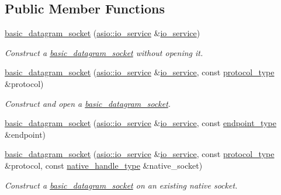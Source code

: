 \subsection*{Public Member Functions}
\begin{DoxyCompactItemize}
\item 
\hyperlink{classasio_1_1basic__datagram__socket_ae77f8c12f6b4b1e79cb46bedc7e7b1f8}{basic\+\_\+datagram\+\_\+socket} (\hyperlink{classasio_1_1io__service}{asio\+::io\+\_\+service} \&\hyperlink{classasio_1_1io__service}{io\+\_\+service})
\begin{DoxyCompactList}\small\item\em Construct a \hyperlink{classasio_1_1basic__datagram__socket}{basic\+\_\+datagram\+\_\+socket} without opening it. \end{DoxyCompactList}\item 
\hyperlink{classasio_1_1basic__datagram__socket_a6f9602b7c0fb440492380d679d2d01d4}{basic\+\_\+datagram\+\_\+socket} (\hyperlink{classasio_1_1io__service}{asio\+::io\+\_\+service} \&\hyperlink{classasio_1_1io__service}{io\+\_\+service}, const \hyperlink{classasio_1_1basic__datagram__socket_ab65a458559daaa97ef48f6ee8ce46276}{protocol\+\_\+type} \&protocol)
\begin{DoxyCompactList}\small\item\em Construct and open a \hyperlink{classasio_1_1basic__datagram__socket}{basic\+\_\+datagram\+\_\+socket}. \end{DoxyCompactList}\item 
\hyperlink{classasio_1_1basic__datagram__socket_acaa6d8654677fc051647817017df08da}{basic\+\_\+datagram\+\_\+socket} (\hyperlink{classasio_1_1io__service}{asio\+::io\+\_\+service} \&\hyperlink{classasio_1_1io__service}{io\+\_\+service}, const \hyperlink{classasio_1_1basic__datagram__socket_af952c8d18c85588a16531cfc54a172bb}{endpoint\+\_\+type} \&endpoint)
\item 
\hyperlink{classasio_1_1basic__datagram__socket_ad356028b2d9f2a3698733e5022101fed}{basic\+\_\+datagram\+\_\+socket} (\hyperlink{classasio_1_1io__service}{asio\+::io\+\_\+service} \&\hyperlink{classasio_1_1io__service}{io\+\_\+service}, const \hyperlink{classasio_1_1basic__datagram__socket_ab65a458559daaa97ef48f6ee8ce46276}{protocol\+\_\+type} \&protocol, const \hyperlink{classasio_1_1basic__datagram__socket_a6e056acde4635471987bd2e39024d39c}{native\+\_\+handle\+\_\+type} \&native\+\_\+socket)
\begin{DoxyCompactList}\small\item\em Construct a \hyperlink{classasio_1_1basic__datagram__socket}{basic\+\_\+datagram\+\_\+socket} on an existing native socket. \end{DoxyCompactList}\item 

\end{DoxyCompactItemize}
